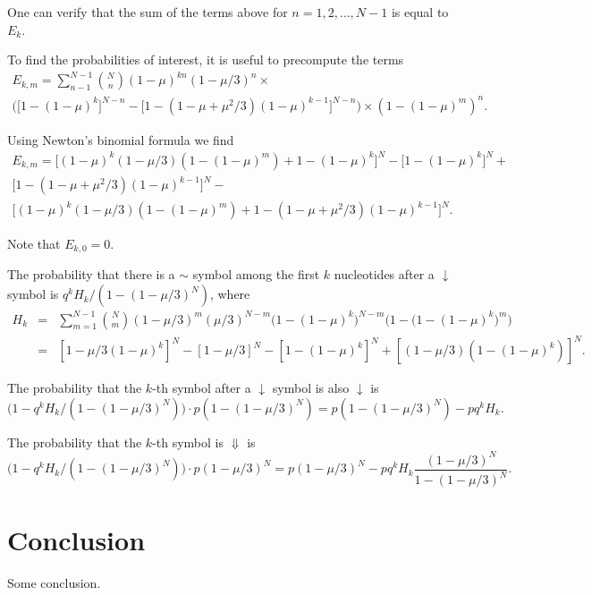 \documentclass{article}
\newcommand{\DN}{\scriptstyle{\Downarrow}}
\newcommand{\dn}{\scriptstyle{\downarrow}}
\newcommand{\eqg}{\scriptstyle{\sim}}
\begin{document}
One can verify that the sum of the terms above for $n=1, 2, \ldots, N-1$
is equal to $E_k$.

To find the probabilities of interest, it is useful to precompute the
terms
\begin{equation*}
\begin{split}
E_{k,m} = \sum_{n-1}^{N-1}{N \choose n} (1-\mu)^{kn} (1-\mu/3)^n \times \\
\bigg( \big[ 1-(1-\mu)^k \big]^{N-n} -
\big[1-(1-\mu+\mu^2/3)(1-\mu)^{k-1} \big]^{N-n} \bigg) \times
(1-(1-\mu)^m)^n.
\end{split}
\end{equation*}

Using Newton's binomial formula we find
\begin{equation*}
\begin{split}
E_{k,m} = \big[ (1-\mu)^k(1-\mu/3)(1-(1-\mu)^m) + 1-(1-\mu)^k \big]^N
- \big[1-(1-\mu)^k \big]^N + \\
\big[ 1-(1-\mu+\mu^2/3)(1-\mu)^{k-1} \big]^N - \\
\big[(1-\mu)^k(1-\mu/3)(1-(1-\mu)^m) +
1-(1-\mu+\mu^2/3)(1-\mu)^{k-1} \big]^N.
\end{split}
\end{equation*}

Note that $E_{k,0} = 0$.

The probability that there is a $\eqg$ symbol among the first $k$
nucleotides after a $\dn$ symbol is $q^k H_k / (1-(1-\mu/3)^N)$, where
\begin{eqnarray*}
H_k &=&
\sum_{m=1}^{N-1}{N \choose m}
(1-\mu/3)^m(\mu/3)^{N-m} \big(1-(1-\mu)^k\big)^{N-m}
\big(1 - \big( 1-(1-\mu)^k \big)^m\big) \\
&=& [1-\mu/3(1-\mu)^k]^N - [1-\mu/3]^N - [1-(1-\mu)^k]^N +
[(1-\mu/3)(1-(1-\mu)^k)]^N.
\end{eqnarray*}

The probability that the $k$-th symbol after a $\dn$ symbol is also $\dn$
is
\begin{equation*}
\big( 1-q^kH_k/(1-(1-\mu/3)^N) \big) \cdot p(1-(1-\mu/3)^N) =
p(1-(1-\mu/3)^N) - pq^kH_k.
\end{equation*}

The probability that the $k$-th symbol is $\DN$ is
\begin{equation*}
\big( 1-q^kH_k/(1-(1-\mu/3)^N) \big) \cdot p(1-\mu/3)^N =
p(1-\mu/3)^N - pq^kH_k \frac{(1-\mu/3)^N}{1-(1-\mu/3)^N}.
\end{equation*}

\section{Conclusion}
Some conclusion.
\end{document}
